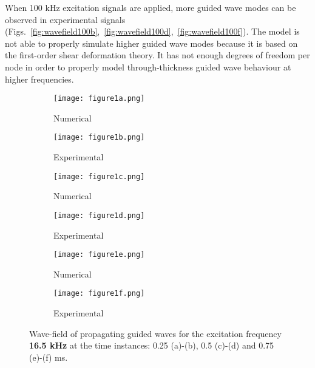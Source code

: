 \documentclass[runningheads]{llncs}
\begin{document}
When 100 kHz excitation signals are applied, more guided wave modes can be observed in experimental signals (Figs.~\ref{fig:wavefield100b},~\ref{fig:wavefield100d},~\ref{fig:wavefield100f}).
The model is not able to properly simulate higher guided wave modes because it is based on the first-order shear deformation theory. 
It has not enough degrees of freedom per node in order to properly model through-thickness guided wave behaviour at higher frequencies.
\begin{figure} [h!]
	\centering
	\begin{subfigure}[b]{0.49\textwidth}
		\centering
		\texttt{[image: figure1a.png]}
		\caption{Numerical}
		\label{fig:wavefield16_5a}
	\end{subfigure}
	\begin{subfigure}[b]{0.49\textwidth}
		\centering
		\texttt{[image: figure1b.png]}
		\caption{Experimental}
		\label{fig:wavefield16_5b}
	\end{subfigure}
	\begin{subfigure}[b]{0.49\textwidth}
		\centering
		\texttt{[image: figure1c.png]}
		\caption{Numerical}
		\label{fig:wavefield16_5c}
	\end{subfigure}
	\begin{subfigure}[b]{0.49\textwidth}
		\centering
		\texttt{[image: figure1d.png]}
		\caption{Experimental}
		\label{fig:wavefield16_5d}
	\end{subfigure}
	\begin{subfigure}[b]{0.49\textwidth}
		\centering
		\texttt{[image: figure1e.png]}
		\caption{Numerical}
		\label{fig:wavefield16_5e}
	\end{subfigure}
	\begin{subfigure}[b]{0.49\textwidth}
		\centering
		\texttt{[image: figure1f.png]}
		\caption{Experimental}
		\label{fig:wavefield16_5f}
	\end{subfigure}
	\caption{Wave-field of propagating guided waves for the excitation frequency \textbf{16.5 kHz} at the time instances:  0.25 (a)-(b), 0.5 (c)-(d) and 0.75 (e)-(f) ms. }
	\label{fig:wavefield16_5}
\end{figure}
\end{document}
